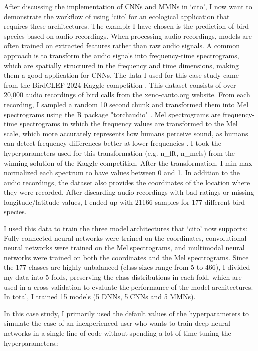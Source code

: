 \documentclass[12pt,twoside]{scrreport}
\newcommand{\pkg}[1]{`#1'}
\begin{document}
After discussing the implementation of CNNs and MMNs in \pkg{cito}, I now want to demonstrate the workflow of using \pkg{cito} for an ecological application that requires these architectures. The example I have chosen is the prediction of bird species based on audio recordings. When processing audio recordings, models are often trained on extracted features rather than raw audio signals. A common approach is to transform the audio signals into frequency-time spectrograms, which are spatially structured in the frequency and time dimensions, making them a good application for CNNs.
The data I used for this case study came from the BirdCLEF 2024 Kaggle competition \citep{birdclef-2024}. This dataset consists of over 20,000 audio recordings of bird calls from the \url{xeno-canto.org} website. From each recording, I sampled a random 10 second chunk and transformed them into Mel spectrograms using the R package "torchaudio" \citep{keydanaTorchaudioInterfacePytorchs2023}. Mel spectrograms are frequency-time spectrograms in which the frequency values are transformed to the Mel scale, which more accurately represents how humans perceive sound, as humans can detect frequency differences better at lower frequencies \citep{stevensScaleMeasurementPsychological1937}. I took the hyperparameters used for this transformation (e.g. n\_fft, n\_mels) from the winning solution of the Kaggle competition. After the transformation, I min-max normalized each spectrum to have values between 0 and 1. In addition to the audio recordings, the dataset also provides the coordinates of the location where they were recorded. After discarding audio recordings with bad ratings or missing longitude/latitude values, I ended up with 21166 samples for 177 different bird species.

I used this data to train the three model architectures that \pkg{cito} now supports: Fully connected neural networks were trained on the coordinates, convolutional neural networks were trained on the Mel spectrograms, and multimodal neural networks were trained on both the coordinates and the Mel spectrograms. Since the 177 classes are highly unbalanced (class sizes range from 5 to 466), I divided my data into 5 folds, preserving the class distributions in each fold, which are used in a cross-validation to evaluate the performance of the model architectures. In total, I trained 15 models (5 DNNs, 5 CNNs and 5 MMNs).

In this case study, I primarily used the default values of the hyperparameters to simulate the case of an inexperienced user who wants to train deep neural networks in a single line of code without spending a lot of time tuning the hyperparameters.:
\end{document}
